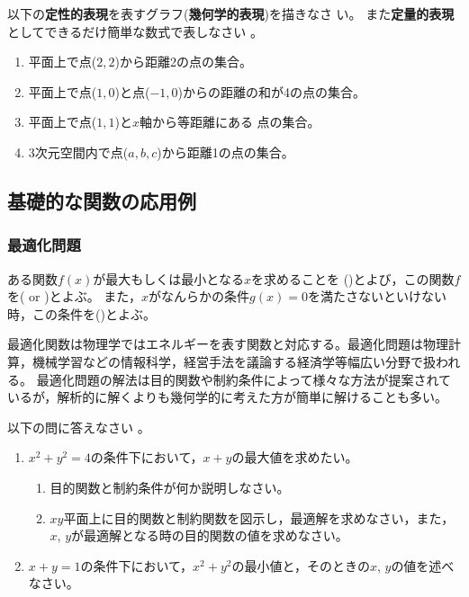 \documentclass[twocolumn,11pt]{jarticle}
\begin{document}
\nquestion
以下の\textbf{定性的表現}を表すグラフ(\textbf{幾何学的表現})を描きなさ
い。
また\textbf{定量的表現}としてできるだけ簡単な数式で表しなさい
。
\begin{enumerate}
\item\label{jitem:circle} 平面上で点($2,2$)から距離2の点の集合。
\item\label{jitem:ellipse}
  平面上で点($1,0$)と点($-1,0$)からの距離の和が4の点の集合。
\item\label{jitem:parabola} 平面上で点($1,1$)と$x$軸から等距離にある
  点の集合。
\item\label{jitem:sphere} 3次元空間内で点($a,b,c$)から距離1の点の集合。
\end{enumerate}


\subsection{基礎的な関数の応用例}
\subsubsection{最適化問題}
ある関数$f(x)$が最大もしくは最小となる$x$を求めることを
()とよび，この関数$f$を( or )とよぶ。
また，$x$がなんらかの条件$g(x)=0$を満たさないといけない時，この条件を()とよぶ。

最適化関数は物理学ではエネルギーを表す関数と対応する。最適化問題は物理計算，機械学習などの情報科学，経営手法を議論する経済学等幅広い分野で扱われる。
最適化問題の解法は目的関数や制約条件によって様々な方法が提案されているが，解析的に解くよりも幾何学的に考えた方が簡単に解けることも多い。

\nquestion
以下の問に答えなさい
。
\begin{enumerate}
\item\label{item:range(x+y)} $x^2+y^2=4$の条件下において，$x+y$の最大値を求めたい。
	\begin{enumerate}
	\item 目的関数と制約条件が何か説明しなさい。
	\item $xy$平面上に目的関数と制約関数を図示し，最適解を求めなさい，また，$x$, $y$が最適解となる時の目的関数の値を求めなさい。
	\end{enumerate}
\item\label{item:min(x^2+y^2)} $x+y=1$の条件下において，$x^2+y^2$の最小値と，そのときの$x$, $y$の値を述べなさい。
\end{enumerate}
\end{document}

